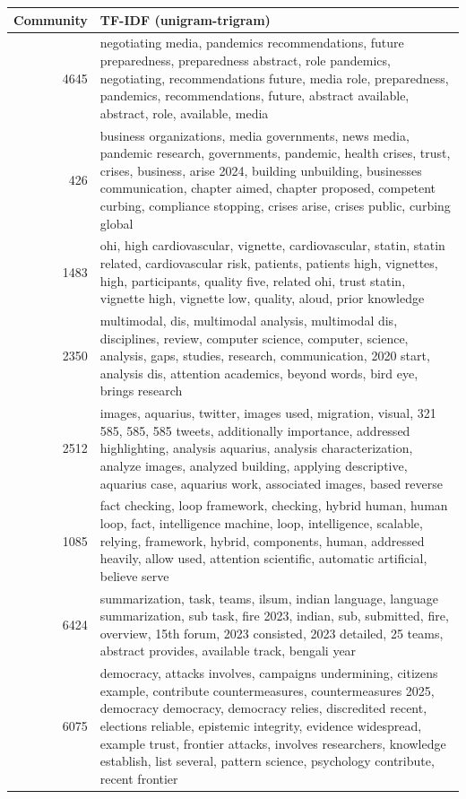 \begin{tabular}{rl}
\toprule
Community & TF-IDF (unigram-trigram) \\
\midrule
4645 & negotiating media, pandemics recommendations, future preparedness, preparedness abstract, role pandemics, negotiating, recommendations future, media role, preparedness, pandemics, recommendations, future, abstract available, abstract, role, available, media \\
426 & business organizations, media governments, news media, pandemic research, governments, pandemic, health crises, trust, crises, business, arise 2024, building unbuilding, businesses communication, chapter aimed, chapter proposed, competent curbing, compliance stopping, crises arise, crises public, curbing global \\
1483 & ohi, high cardiovascular, vignette, cardiovascular, statin, statin related, cardiovascular risk, patients, patients high, vignettes, high, participants, quality five, related ohi, trust statin, vignette high, vignette low, quality, aloud, prior knowledge \\
2350 & multimodal, dis, multimodal analysis, multimodal dis, disciplines, review, computer science, computer, science, analysis, gaps, studies, research, communication, 2020 start, analysis dis, attention academics, beyond words, bird eye, brings research \\
2512 & images, aquarius, twitter, images used, migration, visual, 321 585, 585, 585 tweets, additionally importance, addressed highlighting, analysis aquarius, analysis characterization, analyze images, analyzed building, applying descriptive, aquarius case, aquarius work, associated images, based reverse \\
1085 & fact checking, loop framework, checking, hybrid human, human loop, fact, intelligence machine, loop, intelligence, scalable, relying, framework, hybrid, components, human, addressed heavily, allow used, attention scientific, automatic artificial, believe serve \\
6424 & summarization, task, teams, ilsum, indian language, language summarization, sub task, fire 2023, indian, sub, submitted, fire, overview, 15th forum, 2023 consisted, 2023 detailed, 25 teams, abstract provides, available track, bengali year \\
6075 & democracy, attacks involves, campaigns undermining, citizens example, contribute countermeasures, countermeasures 2025, democracy democracy, democracy relies, discredited recent, elections reliable, epistemic integrity, evidence widespread, example trust, frontier attacks, involves researchers, knowledge establish, list several, pattern science, psychology contribute, recent frontier \\

\end{tabular}
